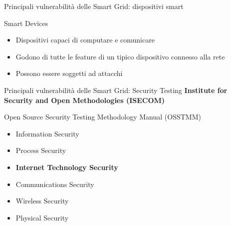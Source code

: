 \begin{frame}{Principali vulnerabilità delle Smart Grid: dispositivi smart}
	\begin{block}{Smart Devices}
		\begin{itemize}
			\item Dispositivi capaci di computare e comunicare
			\item Godono di tutte le feature di un tipico dispositivo connesso alla rete
			\item Possono essere soggetti ad attacchi
		\end{itemize}
	\end{block}
\end{frame}

\begin{frame}{Principali vulnerabilità delle Smart Grid: Security Testing}
	\textbf{Institute for Security and Open Methodologies (ISECOM)}
	\begin{block}{Open Source Security Testing Methodology Manual (OSSTMM)}
		\begin{itemize}
			\item Information Security
			\item Process Security
			\item \textbf{Internet Technology Security}
			\item Communications Security
			\item Wireless Security
			\item Physical Security
		\end{itemize}
	\end{block}
\end{frame}


